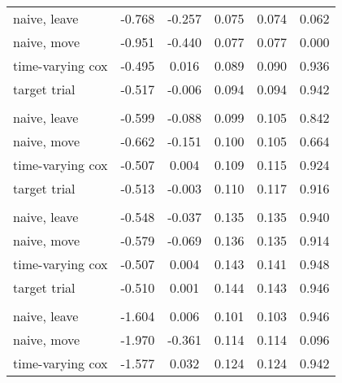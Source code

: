 \begin{tabular}{lccccc}
    \hspace{1em}naive, leave & -0.768 & -0.257 & 0.075 & 0.074 & 0.062\\
    \hspace{1em}naive, move & -0.951 & -0.440 & 0.077 & 0.077 & 0.000\\
    \hspace{1em}time-varying cox & -0.495 & 0.016 & 0.089 & 0.090 & 0.936\\
    \hspace{1em}target trial & -0.517 & -0.006 & 0.094 & 0.094 & 0.942\\
    \addlinespace[0.3em]
    \multicolumn{6}{l}{\textit{$VE_\lambda$ = 40\% and $\mu = 9$}}\\
    \hspace{1em}naive, leave & -0.599 & -0.088 & 0.099 & 0.105 & 0.842\\
    \hspace{1em}naive, move & -0.662 & -0.151 & 0.100 & 0.105 & 0.664\\
    \hspace{1em}time-varying cox & -0.507 & 0.004 & 0.109 & 0.115 & 0.924\\
    \hspace{1em}target trial & -0.513 & -0.003 & 0.110 & 0.117 & 0.916\\
    \addlinespace[0.3em]
    \multicolumn{6}{l}{\textit{$VE_\lambda$ = 40\% and $\mu = 15$}}\\
    \hspace{1em}naive, leave & -0.548 & -0.037 & 0.135 & 0.135 & 0.940\\
    \hspace{1em}naive, move & -0.579 & -0.069 & 0.136 & 0.135 & 0.914\\
    \hspace{1em}time-varying cox & -0.507 & 0.004 & 0.143 & 0.141 & 0.948\\
    \hspace{1em}target trial & -0.510 & 0.001 & 0.144 & 0.143 & 0.946\\
    \addlinespace[0.3em]
    \multicolumn{6}{l}{\textit{$VE_\lambda$ = 80\% and $\mu = 3$}}\\
    \hspace{1em}naive, leave & -1.604 & 0.006 & 0.101 & 0.103 & 0.946\\
    \hspace{1em}naive, move & -1.970 & -0.361 & 0.114 & 0.114 & 0.096\\
    \hspace{1em}time-varying cox & -1.577 & 0.032 & 0.124 & 0.124 & 0.942\\

\end{tabular}
